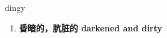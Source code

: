 
\begin{frame}
{\huge dingy}
\begin{center}
\begin{enumerate}\Large
  \item \textbf{昏暗的，肮脏的 darkened and dirty}
\end{enumerate}
\end{center}
\end{frame}
